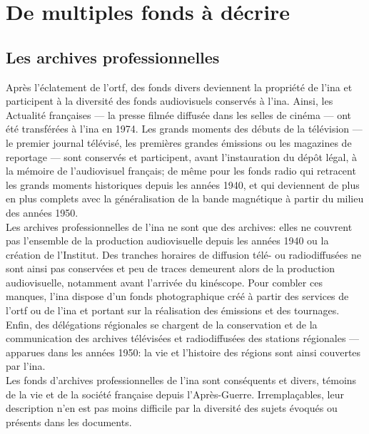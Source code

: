 \section{\label{I-B-1}De multiples fonds à décrire}


\subsection{\label{I-B-1-a}Les archives professionnelles}

Après l'éclatement de l'\ac{ortf}, des fonds divers deviennent la propriété de l'\ac{ina} et participent à la diversité des fonds audiovisuels conservés à l'\ac{ina}. Ainsi, les \og Actualité françaises\fg{} --- la presse filmée diffusée dans les selles de cinéma --- ont été transférées à l'\ac{ina} en 1974. Les grands moments des débuts de la télévision --- le premier journal télévisé, les premières grandes émissions ou les magazines de reportage --- sont conservés et participent, avant l'instauration du dépôt légal, à la mémoire de l'audiovisuel français; de même pour les fonds radio qui retracent les grands moments historiques depuis les années 1940, et qui deviennent de plus en plus complets avec la généralisation de la bande magnétique à partir du milieu des années 1950.\\

Les archives professionnelles de l'\ac{ina} ne sont que des archives: elles ne couvrent pas l'ensemble de la production audiovisuelle depuis les années 1940 ou la création de l'Institut. Des tranches horaires de diffusion télé- ou radiodiffusées ne sont ainsi pas conservées et peu de traces demeurent alors de la production audiovisuelle, notamment avant l'arrivée du kinéscope. Pour combler ces manques, l'\ac{ina} dispose d'un fonds photographique créé à partir des services de l'\ac{ortf} ou de l'\ac{ina} et portant sur la réalisation des émissions et des tournages.\\

Enfin, des délégations régionales se chargent de la conservation et de la communication des archives télévisées et radiodiffusées des stations régionales --- apparues dans les années 1950: la vie et l'histoire des régions sont ainsi couvertes par l'\ac{ina}.\\

Les fonds d'archives professionnelles de l'\ac{ina} sont conséquents et divers, témoins de la vie et de la société française depuis l'Après-Guerre. Irremplaçables, leur description n'en est pas moins difficile par la diversité des sujets évoqués ou présents dans les documents.

